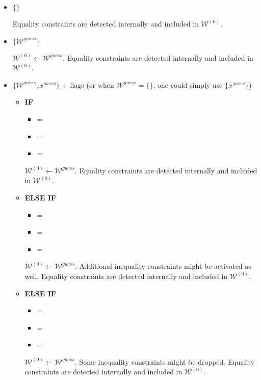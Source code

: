 \documentclass[12pt,a4paper]{article}
\begin{document}
\begin{itemize}
\item {\color{blue}$\{\}$}

  Equality constraints are detected internally and included in $\mathcal{W}^{(0)}$.

\item {\color{blue}$\{\mathcal{W}^{\mathit{guess}}\}$}

  $\mathcal{W}^{(0)} \leftarrow \mathcal{W}^{\mathit{guess}}$. Equality constraints are detected
  internally and included in $\mathcal{W}^{(0)}$. 

\item {\color{blue}$\{\mathcal{W}^{\mathit{guess}}, x^{\mathit{guess}}\}$} + flags (or when
  $\mathcal{W}^{\mathit{guess}} = \{\}$, one could simply use {\color{blue}$\{x^{\mathit{guess}}\}$})

  \begin{itemize}
  \item[\ding{237}] {\bf IF}
    
    \begin{itemize}
    \item {} = 
    \item {} =  
    \item {} = 
    \end{itemize}
    $\mathcal{W}^{(0)} \leftarrow \mathcal{W}^{\mathit{guess}}$. Equality constraints are detected
    internally and included in $\mathcal{W}^{(0)}$. 

  \item[\ding{237}] {\bf ELSE IF}

    \begin{itemize}
    \item {} = 
    \item {\color{blue} = }
    \item {} = 
    \end{itemize}
    $\mathcal{W}^{(0)} \leftarrow \mathcal{W}^{\mathit{guess}}$. Additional inequality constraints
    might be activated as well. Equality constraints are detected internally and included in
    $\mathcal{W}^{(0)}$.

  \item[\ding{237}] {\bf ELSE IF}

    \begin{itemize}
    \item {} = 
    \item {} =  
    \item {\color{blue} = }
    \end{itemize}
    $\mathcal{W}^{(0)} \leftarrow \mathcal{W}^{\mathit{guess}}$. Some inequality constraints
    might be dropped. Equality constraints are detected internally and included in
    $\mathcal{W}^{(0)}$.


\end{itemize}
\end{itemize}
\end{document}
